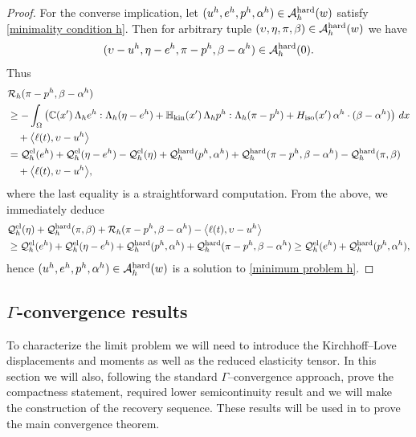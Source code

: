 \documentclass[reqno,10pt]{amsart}
\numberwithin{equation}{section}
\theoremstyle{remark}
\newcommand{\calA}{\mathcal{A}}
\newcommand{\C}{\mathbb{C}}
\newcommand{\calQ}{\mathcal{Q}}
\newcommand{\calR}{\mathcal{R}}
\newcommand{\Hkin}{\mathbb{H}_{\rm kin}}
\newcommand{\Hiso}{H_{\rm iso}}
\begin{document}
\begin{proof}
For the converse implication, let $(u^h, e^h, p^h, \alpha^h) \in \calA_{h}^{\rm hard}(w)$ satisfy \eqref{minimality condition h}.
Then for arbitrary tuple $(\upsilon, \eta, \pi, \beta) \in \calA_{h}^{\rm hard}(w)$ we have
\begin{equation*}
	(\upsilon-u^h, \eta-e^h, \pi-p^h, \beta-\alpha^h) \in \calA_{h}^{\rm hard}(0).
\end{equation*}
Thus
{\allowdisplaybreaks
\begin{align*}
	& \calR_{h}(\pi-p^h, \beta-\alpha^h) 
	\\*& \geq - \int_{\Omega} \left( \C\!\left(x'\right) \Lambda_h e^h : \Lambda_h (\eta-e^h) + \Hkin\!\left(x'\right) \Lambda_h p^h : \Lambda_h (\pi-p^h) + \Hiso\!\left(x'\right) \alpha^h \cdot (\beta-\alpha^h) \right) \,dx
	\\*& \hspace{1em} + \big\langle \ell(t), \upsilon-u^h \big\rangle\\
	& = \calQ^{\rm el}_{h}(e^h) + \calQ^{\rm el}_{h}(\eta-e^h) - \calQ^{\rm el}_{h}(\eta) + \calQ^{\rm hard}_{h}(p^h, \alpha^h) + \calQ^{\rm hard}_{h}(\pi-p^h, \beta-\alpha^h) - \calQ^{\rm hard}_{h}(\pi, \beta)
	\\*& \hspace{1em} + \big\langle \ell(t), \upsilon-u^h \big\rangle,
\end{align*}
}\noindent
where the last equality is a straightforward computation. 
From the above, we immediately deduce
\begin{align*}
	& \calQ^{\rm el}_{h}(\eta) + \calQ^{\rm hard}_{h}(\pi, \beta) + \calR_{h}(\pi-p^h, \beta-\alpha^h) - \big\langle \ell(t), \upsilon-u^h \big\rangle
	\\& \geq \calQ^{\rm el}_{h}(e^h) + \calQ^{\rm el}_{h}(\eta-e^h) + \calQ^{\rm hard}_{h}(p^h, \alpha^h) + \calQ^{\rm hard}_{h}(\pi-p^h, \beta-\alpha^h) 
	\geq \calQ^{\rm el}_{h}(e^h) + \calQ^{\rm hard}_{h}(p^h, \alpha^h),
\end{align*}
hence $(u^h, e^h, p^h, \alpha^h) \in \calA_{h}^{\rm hard}(w)$ is a solution to \eqref{minimum problem h}.
\end{proof}

\subsection{\texorpdfstring{$\Gamma$}{Γ}-convergence results} \label{section gamma converegence results} 

To characterize the limit problem we will need to introduce the Kirchhoff--Love displacements and moments as well as the reduced elasticity tensor. In this section we will also, following the standard $\Gamma$--convergence approach, prove the compactness statement, required lower semicontinuity result and we will make the construction of the recovery sequence. These results will be used in  to prove the main convergence theorem. 
\end{document}
